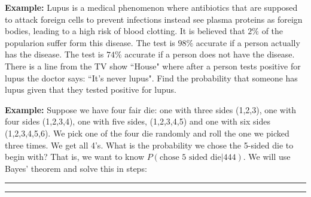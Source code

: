 \documentclass[oneside]{amsart}
\makeatletter
\def\vhrulefill#1{\leavevmode\leaders\hrule\@height#1\hfill \kern\z@}
\theoremstyle{definition}
\theoremstyle{definition}
\makeatother
\begin{document}
\textbf{Example:} Lupus is a medical phenomenon where antibiotics that are supposed to attack foreign cells to prevent infections instead see plasma proteins as foreign bodies, leading to a high risk of blood clotting. It is believed that $2 \%$ of the popularion suffer form this disease. The test is $98 \%$ accurate if a person actually has the disease. The test is $74 \%$ accurate if a person does not have the disease. There is a line from the TV show ``House" where after a person tests positive for lupus the doctor says: ``It's never lupus". Find the probability that someone has lupus given that they tested positive for lupus.

\vfill
\vfill
\vfill
\vfill




\newpage

\textbf{Example:} Suppose we have four fair die: one with three sides (1,2,3), one with four sides (1,2,3,4), one with five sides, (1,2,3,4,5) and one
with six sides (1,2,3,4,5,6). We pick one of the four die randomly and roll the one we picked three times. We get all 4's. What is the probability we chose the 5-sided die to begin with? That is, we want to know $P(\text{chose 5 sided die}|444)$. We will use Bayes' theorem and solve this in steps:

\vfill 
\vfill


\vhrulefill{2pt}

\vspace{1mm}
\vhrulefill{2pt}
\\
\end{document}
